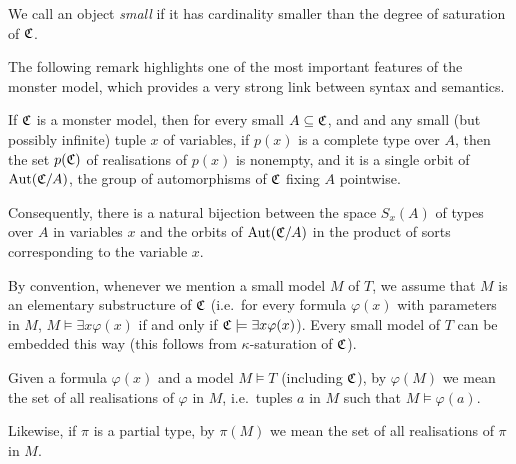 	\begin{dfn}
		We call an object \emph{small} if it has cardinality smaller than the degree of saturation of ${\mathfrak C}$.\xqed{\lozenge}
	\end{dfn}
	
	The following remark highlights one of the most important features of the monster model, which provides a very strong link between syntax and semantics.
	\begin{rem}
		\label{rem:types_orbits}
		If ${\mathfrak C}$ is a monster model, then for every small $A\subseteq {\mathfrak C}$, and and any small (but possibly infinite) tuple $x$ of variables, if $p(x)$ is a complete type over $A$, then the set $p({\mathfrak C})$ of realisations of $p(x)$ is nonempty, and it is a single orbit of $\operatorname{{Aut}}({\mathfrak C}/A)$, the group of automorphisms of ${\mathfrak C}$ fixing $A$ pointwise.
		
		Consequently, there is a natural bijection between the space $S_x(A)$ of types over $A$ in variables $x$ and the orbits of $\operatorname{{Aut}}({\mathfrak C}/A)$ in the product of sorts corresponding to the variable $x$.
		\xqed{\lozenge}
	\end{rem}
	
	By convention, whenever we mention a small model $M$ of $T$, we assume that $M$ is an elementary substructure of ${\mathfrak C}$ (i.e.\ for every formula $\varphi(x)$ with parameters in $M$, $M\models \exists x \varphi(x)$ if and only if ${\mathfrak C}\models \exists x \varphi(x)$). Every small model of $T$ can be embedded this way (this follows from $\kappa$-saturation of ${\mathfrak C}$).
	
	\begin{dfn}
		\index{phi(M)@$\varphi(M)$}
		Given a formula $\varphi(x)$ and a model $M\models T$ (including ${\mathfrak C}$), by $\varphi(M)$ we mean the set of all realisations of $\varphi$ in $M$, i.e.\ tuples $a$ in $M$ such that $M\models \varphi(a)$.
		
		Likewise, if $\pi$ is a partial type, by $\pi(M)$ we mean the set of all realisations of $\pi$ in $M$.
		\xqed{\lozenge}
	\end{dfn}
	
